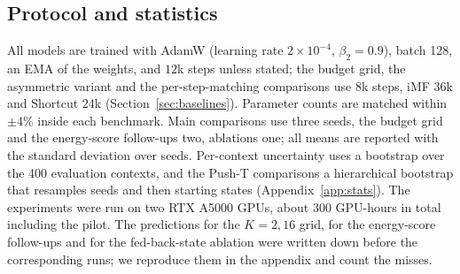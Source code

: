 \subsection{Protocol and statistics}
\label{sec:protocol}
All models are trained with AdamW (learning rate $2\times10^{-4}$, $\beta_2 = 0.9$), batch 128, an EMA of the weights, and $12$k steps unless stated; the budget grid, the asymmetric variant and the per-step-matching comparisons use $8$k steps, iMF $36$k and Shortcut $24$k (Section~\ref{sec:baselines}). Parameter counts are matched within $\pm4\%$ inside each benchmark. Main comparisons use three seeds, the budget grid and the energy-score follow-ups two, ablations one; all means are reported with the standard deviation over seeds. Per-context uncertainty uses a bootstrap over the 400 evaluation contexts, and the Push-T comparisons a hierarchical bootstrap that resamples seeds and then starting states (Appendix~\ref{app:stats}). The experiments were run on two RTX A5000 GPUs, about $300$ GPU-hours in total including the pilot. The predictions for the $K{=}2,16$ grid, for the energy-score follow-ups and for the fed-back-state ablation were written down before the corresponding runs; we reproduce them in the appendix and count the misses.
